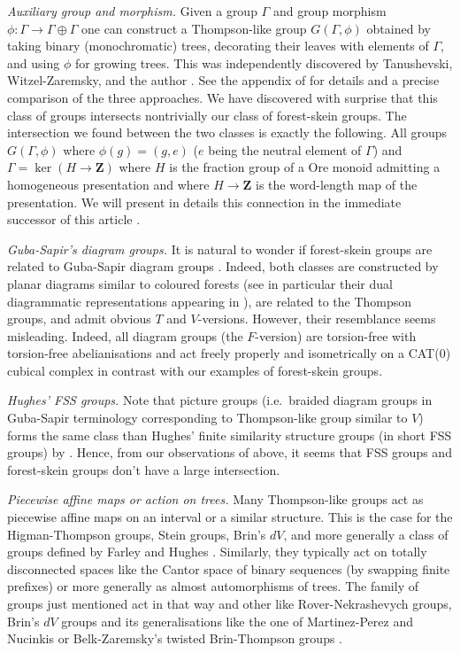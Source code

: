 \documentclass[a4paper, 12pt]{amsart}
\numberwithin{equation}{section}
\theoremstyle{definition}
\newcommand{\Ga}{\Gamma}
\newcommand{\Z}{\mathbf{Z}}
\begin{document}
{\it Auxiliary group and morphism.}
Given a group $\Ga$ and group morphism $\phi:\Ga\to\Ga\oplus\Ga$ one can construct a Thompson-like group $G(\Ga,\phi)$ obtained by taking binary (monochromatic) trees, decorating their leaves with elements of $\Ga$, and using $\phi$ for growing trees. 
This was independently discovered by Tanushevski, Witzel-Zaremsky, and the author \cite{Tanushevski16, Witzel-Zaremsky18, Brothier22}.
See the appendix of \cite{Brothier22} for details and a precise comparison of the three approaches.
We have discovered with surprise that this class of groups intersects nontrivially our class of forest-skein groups.
The intersection we found between the two classes is exactly the following.
All groups $G(\Ga,\phi)$ where $\phi(g)=(g,e)$ ($e$ being the neutral element of $\Ga$) and $\Ga=\ker(H\to \Z)$ where $H$ is the fraction group of a Ore monoid admitting a homogeneous presentation and where $H\to\Z$ is the word-length map of the presentation.
We will present in details this connection in the immediate successor of this article \cite{Brothier22-HPM}.

{\it Guba-Sapir's diagram groups.}
It is natural to wonder if forest-skein groups are related to Guba-Sapir diagram groups \cite{Guba-Sapir97}.
Indeed, both classes are constructed by planar diagrams similar to coloured forests (see in particular their dual diagrammatic representations appearing in \cite[Section 4]{Guba-Sapir97}), are related to the Thompson groups, and admit obvious $T$ and $V$-versions.
However, their resemblance seems misleading. 
Indeed, all diagram groups (the $F$-version) are torsion-free with torsion-free abelianisations and act freely properly and isometrically on a CAT(0) cubical complex in contrast with our examples of forest-skein groups.

{\it Hughes' FSS groups.}
Note that picture groups (i.e.~braided diagram groups in Guba-Sapir terminology corresponding to Thompson-like group similar to $V$) forms the same class than Hughes' finite similarity structure groups (in short FSS groups) by \cite{Hughes09, Farley-Hughes17}.
Hence, from our observations of above, it seems that FSS groups and forest-skein groups don't have a large intersection.

{\it Piecewise affine maps or action on trees.}
Many Thompson-like groups act as piecewise affine maps on an interval or a similar structure.
This is the case for the Higman-Thompson groups, Stein groups, Brin's $dV$, and more generally a class of groups defined by Farley and Hughes \cite{Farley-Hughes20}.
Similarly, they typically act on totally disconnected spaces like the Cantor space of binary sequences (by swapping finite prefixes) or more generally as almost automorphisms of trees. The family of groups just mentioned act in that way and other like R{o}ver-Nekrashevych groups, Brin's $dV$ groups and its generalisations like the one of Martinez-Perez and Nucinkis or Belk-Zaremsky's twisted Brin-Thompson groups \cite{Rover99,Nekrashevych04, Martinez-Perez-Nucinkis13, Belk-Zaremsky22}.
\end{document}

